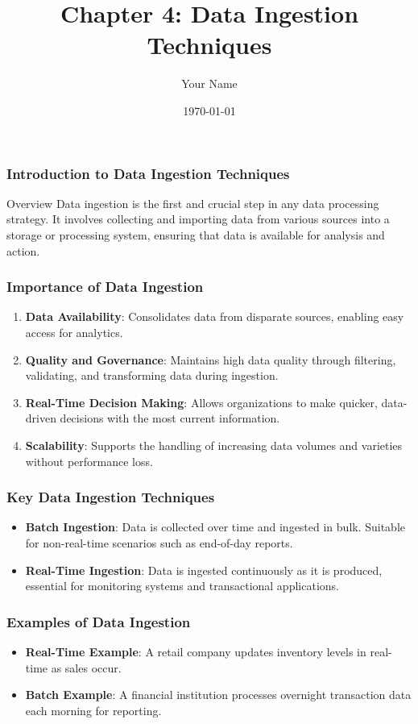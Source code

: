 \documentclass{beamer}
\title{Chapter 4: Data Ingestion Techniques}
\author{Your Name}
\institute{Your Institution}
\date{\today}
\begin{document}
\frame{\titlepage}

\begin{frame}[fragile]
    \frametitle{Introduction to Data Ingestion Techniques}
    \begin{block}{Overview}
        Data ingestion is the first and crucial step in any data processing strategy. It involves collecting and importing data from various sources into a storage or processing system, ensuring that data is available for analysis and action.
    \end{block}
\end{frame}

\begin{frame}[fragile]
    \frametitle{Importance of Data Ingestion}
    \begin{enumerate}
        \item \textbf{Data Availability}: Consolidates data from disparate sources, enabling easy access for analytics.
        \item \textbf{Quality and Governance}: Maintains high data quality through filtering, validating, and transforming data during ingestion.
        \item \textbf{Real-Time Decision Making}: Allows organizations to make quicker, data-driven decisions with the most current information.
        \item \textbf{Scalability}: Supports the handling of increasing data volumes and varieties without performance loss.
    \end{enumerate}
\end{frame}

\begin{frame}[fragile]
    \frametitle{Key Data Ingestion Techniques}
    \begin{itemize}
        \item \textbf{Batch Ingestion}: Data is collected over time and ingested in bulk. Suitable for non-real-time scenarios such as end-of-day reports.
        \item \textbf{Real-Time Ingestion}: Data is ingested continuously as it is produced, essential for monitoring systems and transactional applications.
    \end{itemize}
\end{frame}

\begin{frame}[fragile]
    \frametitle{Examples of Data Ingestion}
    \begin{itemize}
        \item \textbf{Real-Time Example}: A retail company updates inventory levels in real-time as sales occur.
        \item \textbf{Batch Example}: A financial institution processes overnight transaction data each morning for reporting.
    \end{itemize}
\end{frame}
\end{document}
